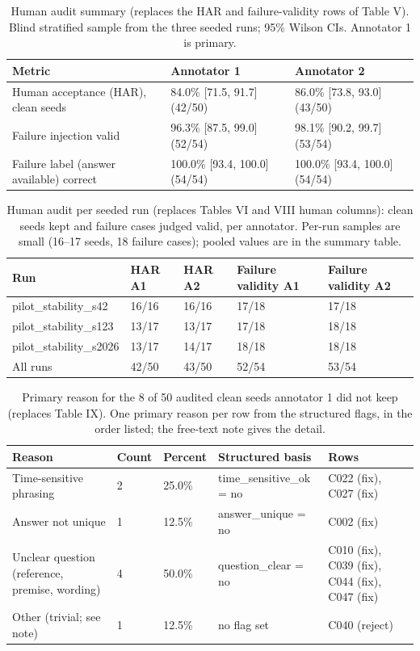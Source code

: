 \begin{table}[t]
\centering
\caption{Human audit summary (replaces the HAR and failure-validity rows of Table V). Blind stratified sample from the three seeded runs; 95\% Wilson CIs. Annotator 1 is primary.}
\small
\begin{tabular}{p{}ll}
\toprule
Metric & Annotator 1 & Annotator 2 \\
\midrule
Human acceptance (HAR), clean seeds & 84.0\% {[}71.5, 91.7{]} (42/50) & 86.0\% {[}73.8, 93.0{]} (43/50) \\
Failure injection valid & 96.3\% {[}87.5, 99.0{]} (52/54) & 98.1\% {[}90.2, 99.7{]} (53/54) \\
Failure label (answer available) correct & 100.0\% {[}93.4, 100.0{]} (54/54) & 100.0\% {[}93.4, 100.0{]} (54/54) \\
\bottomrule
\end{tabular}
\end{table}

\begin{table}[t]
\centering
\caption{Human audit per seeded run (replaces Tables VI and VIII human columns): clean seeds kept and failure cases judged valid, per annotator. Per-run samples are small (16–17 seeds, 18 failure cases); pooled values are in the summary table.}
\small
\begin{tabular}{lllll}
\toprule
Run & HAR A1 & HAR A2 & Failure validity A1 & Failure validity A2 \\
\midrule
pilot\_stability\_s42 & 16/16 & 16/16 & 17/18 & 17/18 \\
pilot\_stability\_s123 & 13/17 & 13/17 & 17/18 & 18/18 \\
pilot\_stability\_s2026 & 13/17 & 14/17 & 18/18 & 18/18 \\
All runs & 42/50 & 43/50 & 52/54 & 53/54 \\
\bottomrule
\end{tabular}
\end{table}

\begin{table}[t]
\centering
\caption{Primary reason for the 8 of 50 audited clean seeds annotator 1 did not keep (replaces Table IX). One primary reason per row from the structured flags, in the order listed; the free-text note gives the detail.}
\small
\begin{tabular}{p{}llp{}p{}}
\toprule
Reason & Count & Percent & Structured basis & Rows \\
\midrule
Time-sensitive phrasing & 2 & 25.0\% & time\_sensitive\_ok = no & C022 (fix), C027 (fix) \\
Answer not unique & 1 & 12.5\% & answer\_unique = no & C002 (fix) \\
Unclear question (reference, premise, wording) & 4 & 50.0\% & question\_clear = no & C010 (fix), C039 (fix), C044 (fix), C047 (fix) \\
Other (trivial; see note) & 1 & 12.5\% & no flag set & C040 (reject) \\
\bottomrule
\end{tabular}
\end{table}

